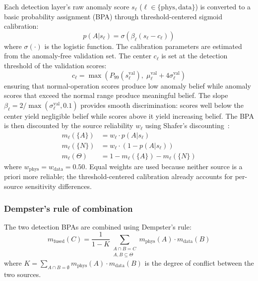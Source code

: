 \documentclass[preprint,12pt,review]{elsarticle}
\begin{document}
Each detection layer's raw anomaly score $s_\ell$ ($\ell \in \{\mathrm{phys}, \mathrm{data}\}$) is converted to a basic probability assignment (BPA) through threshold-centered sigmoid calibration:
\begin{equation}
p(A | s_\ell) = \sigma\!\left(\beta_\ell (s_\ell - c_\ell)\right)
\label{eq:calibration}
\end{equation}
where $\sigma(\cdot)$ is the logistic function. The calibration parameters are estimated from the anomaly-free validation set. The center $c_\ell$ is set at the detection threshold of the validation scores:
\begin{equation}
c_\ell = \max\!\left(P_{99}(s_\ell^{\mathrm{val}}),\; \mu_\ell^{\mathrm{val}} + 4\sigma_\ell^{\mathrm{val}}\right)
\label{eq:sigmoid_center}
\end{equation}
ensuring that normal-operation scores produce low anomaly belief while anomaly scores that exceed the normal range produce meaningful belief. The slope $\beta_\ell = 2 / \max(\sigma_\ell^{\mathrm{val}}, 0.1)$ provides smooth discrimination: scores well below the center yield negligible belief while scores above it yield increasing belief. The BPA is then discounted by the source reliability $w_\ell$ using Shafer's discounting~\cite{shafer1976mathematical}:
\begin{align}
m_\ell(\{A\}) &= w_\ell \cdot p(A | s_\ell) \label{eq:bpa_anomalous} \\
m_\ell(\{N\}) &= w_\ell \cdot (1 - p(A | s_\ell)) \label{eq:bpa_normal} \\
m_\ell(\Theta) &= 1 - m_\ell(\{A\}) - m_\ell(\{N\}) \label{eq:bpa_uncertainty}
\end{align}
where $w_{\mathrm{phys}} = w_{\mathrm{data}} = 0.50$. Equal weights are used because neither source is a priori more reliable; the threshold-centered calibration already accounts for per-source sensitivity differences.

\subsubsection{Dempster's rule of combination}

The two detection BPAs are combined using Dempster's rule:
\begin{equation}
m_{\mathrm{fused}}(C) = \frac{1}{1 - K} \sum_{\substack{A \cap B = C \\ A, B \subseteq \Theta}} m_{\mathrm{phys}}(A) \cdot m_{\mathrm{data}}(B)
\label{eq:dempster_rule}
\end{equation}
where $K = \sum_{A \cap B = \emptyset} m_{\mathrm{phys}}(A) \cdot m_{\mathrm{data}}(B)$ is the degree of conflict between the two sources.
\end{document}
